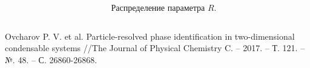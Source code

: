 \documentclass[pdf,hyperref={unicode}]{beamer}
\begin{document}
\begin{frame}
\begin{columns}
\begin{column}{0.47\linewidth}
\end{column}
\begin{column}{0.47\linewidth}
{
\begin{figure}[h]
\caption{ \tiny Распределение параметра $R$.}
\end{figure}
}
\end{column}
\end{columns}
\vspace{4mm}
\tiny{
Ovcharov P. V. et al. Particle-resolved phase identification in two-dimensional condensable systems //The Journal of Physical Chemistry C. – 2017. – Т. 121. – №. 48. – С. 26860-26868.
}
\end{frame}
\end{document}
